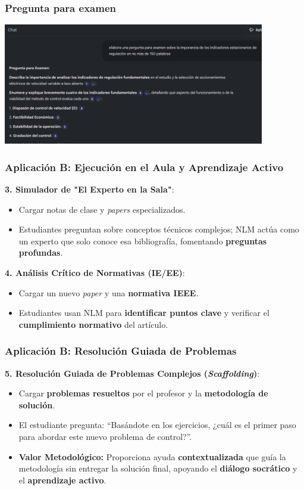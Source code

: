 \documentclass[aspectratio=43]{beamer}
\begin{document}
\begin{frame}
  \frametitle{Pregunta para examen}
  \begin{center}
    \includegraphics[width=4.5in]{pregunta.png}
  \end{center}
\end{frame}

\begin{frame}
\frametitle{ Aplicación B: Ejecución en el Aula y Aprendizaje Activo}

\textbf{3. Simulador de "El Experto en la Sala"}:
\begin{itemize}
    \item Cargar notas de clase y \textit{papers} especializados.
    \item Estudiantes preguntan sobre conceptos técnicos complejos; NLM actúa como un experto que solo conoce esa bibliografía, fomentando \textbf{preguntas profundas}.
\end{itemize}

\textbf{4. Análisis Crítico de Normativas (IE/EE)}:
\begin{itemize}
    \item Cargar un nuevo \textit{paper} y una \textbf{normativa IEEE}.
    \item Estudiantes usan NLM para \textbf{identificar puntos clave} y verificar el \textbf{cumplimiento normativo} del artículo.
\end{itemize}
\end{frame}

\begin{frame}
\frametitle{ Aplicación B: Resolución Guiada de Problemas}

\textbf{5. Resolución Guiada de Problemas Complejos (\textit{Scaffolding})}:
\begin{itemize}
    \item Cargar \textbf{problemas resueltos} por el profesor y la \textbf{metodología de solución}.
    \item El estudiante pregunta: “Basándote en los ejercicios, ¿cuál es el primer paso para abordar este nuevo problema de control?”.
    \item \textbf{Valor Metodológico:} Proporciona ayuda \textbf{contextualizada} que guía la metodología sin entregar la solución final, apoyando el \textbf{diálogo socrático} y el \textbf{aprendizaje activo}.
\end{itemize}
\end{frame}
\end{document}
